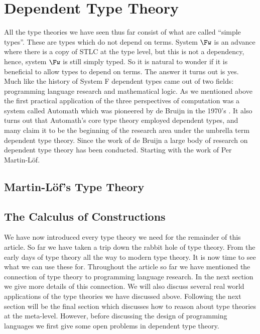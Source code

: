 \documentclass{article}
\begin{document}
\section{Dependent Type Theory}
\label{sec:dependent_type_theory}
All the type theories we have seen thus far consist of what are called
``simple types''.  These are types which do not depend on terms.
System $\Fw$ is an advance where there is a copy of STLC at the type
level, but this is not a dependency, hence, system $\Fw$ is still
simply typed.  So it is natural to wonder if it is beneficial to allow
types to depend on terms.  The answer it turns out is yes. Much like
the history of System F dependent types came out of two fields:
programming language research and mathematical logic.  As we mentioned
above the first practical application of the three perspectives of
computation was a system called Automath which was pioneered by de
Bruijn in the 1970's \cite{DeBruijn:1970}.  It also turns out that
Automath's core type theory employed dependent types, and many claim
it to be the beginning of the research area under the umbrella term
dependent type theory.  Since the work of de Bruijn a large body of
research on dependent type theory has been conducted.  Starting with
the work of Per Martin-L\"of.

\subsection{Martin-L\"of's Type Theory}
\label{subsec:martin-lofs_type_theory}


\subsection{The Calculus of Constructions}
\label{subsec:the_calculus_of_constructions}




We have now introduced every type theory we need for the remainder of
this article.  So far we have taken a trip down the rabbit hole of
type theory.  From the early days of type theory all the way to modern
type theory.  It is now time to see what we can use these for.
Throughout the article so far we have mentioned the connection of type
theory to programming language research.  In the next section we give
more details of this connection.  We will also discuss several real
world applications of the type theories we have discussed above.
Following the next section will be the final section which discusses
how to reason about type theories at the meta-level.  However, before
discussing the design of programming languages we first give some open
problems in dependent type theory.
\end{document}
